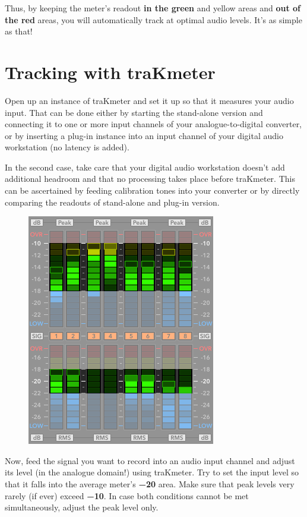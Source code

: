 Thus, by keeping the meter's readout \textbf{in the green} and yellow
areas and \textbf{out of the red} areas, you will automatically track
at optimal audio levels.  It's as simple as that!

\section{Tracking with traKmeter}
\label{sec:tracking_with_trakmeter}

Open up an instance of traKmeter and set it up so that it measures
your audio input.  That can be done either by starting the stand-alone
version and connecting it to one or more input channels of your
analogue-to-digital converter, or by inserting a plug-in instance into
an input channel of your digital audio workstation (no latency is
added).

In the second case, take care that your digital audio workstation
doesn't add additional headroom and that no processing takes place
before traKmeter.  This can be ascertained by feeding calibration
tones into your converter or by directly comparing the readouts of
stand-alone and plug-in version.

\begin{figure}
\includegraphics[scale=0.425,clip]{include/images/trakmeter_optimal.png}
\end{figure}

Now, feed the signal you want to record into an audio input channel
and adjust its level (in the analogue domain!) using traKmeter.  Try
to set the input level so that it falls into the average meter's
\textbf{\SI{-20}{\dBFS}} area.  Make sure that peak levels very rarely
(if ever) exceed \textbf{\SI{-10}{\dBFS}}.  In case both conditions
cannot be met simultaneously, adjust the peak level only.

